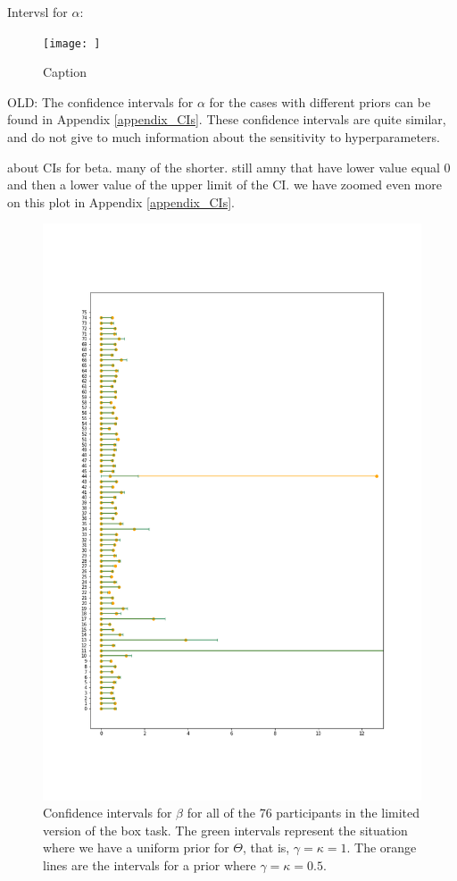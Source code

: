 Intervsl for $\alpha$:
\begin{figure}
    \centering
    \texttt{[image: ]}
    \caption{Caption}
    \label{fig:my_label}
\end{figure}

OLD:
The confidence intervals for $\alpha$ for the cases with different priors can be found in Appendix \ref{appendix_CIs}. These confidence intervals are quite similar, and do not give to much information about the sensitivity to hyperparameters. 

about CIs for beta. 
many of the shorter. still amny that have lower value equal 0 and then a lower value of the upper limit of the CI. 
we have zoomed even more on this plot in Appendix \ref{appendix_CIs}.
\begin{figure}
    \centering
    \includegraphics[scale=0.37]{pictures/Sensitivity/ci_lim_beta_zoom1.png}
    \caption[CIs for $\beta$ for all participants with two different priors, limited]{Confidence intervals for $\beta$ for all of the 76 participants in the limited version of the box task. The green intervals represent the situation where we have a uniform prior for $\Theta$, that is, $\gamma=\kappa=1$. The orange lines are the intervals for a prior where $\gamma=\kappa=0.5$.}
    \label{fig:sensitivity_ci_lim_beta_zoom}
\end{figure}

